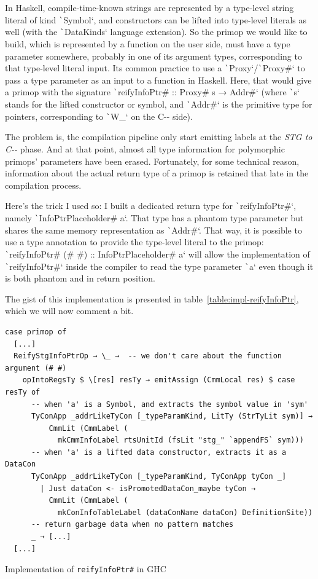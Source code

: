 \documentclass[english]{jflart}
\begin{document}
In Haskell, compile-time-known strings are represented by a type-level string literal of kind \texttt`Symbol`, and constructors can be lifted into type-level literals as well (with the \texttt`DataKinds` language extension). So the primop we would like to build, which is represented by a function on the user side, must have a type parameter somewhere, probably in one of its argument types, corresponding to that type-level literal input. Its common practice to use a \texttt`Proxy`/\texttt`Proxy#` to pass a type parameter as an input to a function in Haskell. Here, that would give a primop with the signature \texttt`reifyInfoPtr# :: Proxy# s → Addr#` (where \texttt`s` stands for the lifted constructor or symbol, and \texttt`Addr#` is the primitive type for pointers, corresponding to \texttt`W_` on the C-{}- side).

The problem is, the compilation pipeline only start emitting labels at the \emph{STG to C-{}-} phase. And at that point, almost all type information for polymorphic primops' parameters have been erased. Fortunately, for some technical reason, information about the actual return type of a primop is retained that late in the compilation process.

Here's the trick I used so: I built a dedicated return type for \texttt`reifyInfoPtr#`, namely \texttt`InfoPtrPlaceholder# a`. That type has a phantom type parameter but shares the same memory representation as \texttt`Addr#`. That way, it is possible to use a type annotation to provide the type-level literal to the primop: \texttt`reifyInfoPtr# (# #) :: InfoPtrPlaceholder# a` will allow the implementation of \texttt`reifyInfoPtr#` inside the compiler to read the type parameter \texttt`a` even though it is both phantom and in return position.

The gist of this implementation is presented in table~\ref{table:impl-reifyInfoPtr}, which we will now comment a bit.

\begin{table}[t]
\small
\begin{verbatim}
case primop of
  [...]
  ReifyStgInfoPtrOp → \_ →  -- we don't care about the function argument (# #)
    opIntoRegsTy $ \[res] resTy → emitAssign (CmmLocal res) $ case resTy of
      -- when 'a' is a Symbol, and extracts the symbol value in 'sym'
      TyConApp _addrLikeTyCon [_typeParamKind, LitTy (StrTyLit sym)] →
          CmmLit (CmmLabel (
            mkCmmInfoLabel rtsUnitId (fsLit "stg_" `appendFS` sym)))
      -- when 'a' is a lifted data constructor, extracts it as a DataCon
      TyConApp _addrLikeTyCon [_typeParamKind, TyConApp tyCon _]
        | Just dataCon <- isPromotedDataCon_maybe tyCon →
          CmmLit (CmmLabel (
            mkConInfoTableLabel (dataConName dataCon) DefinitionSite))
      -- return garbage data when no pattern matches
      _ → [...]
  [...]
\end{verbatim}
\caption{Implementation of \texttt{reifyInfoPtr\#} in GHC}
\label{table:impl-reifyInfoPtr}
\end{table}
\end{document}
